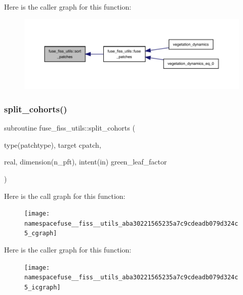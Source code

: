 Here is the caller graph for this function\+:
\nopagebreak
\begin{figure}[H]
\begin{center}
\leavevmode
\includegraphics[width=350pt]{namespacefuse__fiss__utils_a546d7beff2f991a07c8fbba91921ce5f_icgraph}
\end{center}
\end{figure}
\mbox{\label{namespacefuse__fiss__utils_aba30221565235a7c9cdeadb079d324c5}} 
\subsubsection{\texorpdfstring{split\+\_\+cohorts()}{split\_cohorts()}}
{\footnotesize\ttfamily subroutine fuse\+\_\+fiss\+\_\+utils\+::split\+\_\+cohorts (\begin{DoxyParamCaption}\item[{type(patchtype), target}]{cpatch,  }\item[{real, dimension(n\+\_\+pft), intent(in)}]{green\+\_\+leaf\+\_\+factor }\end{DoxyParamCaption})}

Here is the call graph for this function\+:
\nopagebreak
\begin{figure}[H]
\begin{center}
\leavevmode
\texttt{[image: namespacefuse\_\_fiss\_\_utils\_aba30221565235a7c9cdeadb079d324c5\_cgraph]}
\end{center}
\end{figure}
Here is the caller graph for this function\+:
\nopagebreak
\begin{figure}[H]
\begin{center}
\leavevmode
\texttt{[image: namespacefuse\_\_fiss\_\_utils\_aba30221565235a7c9cdeadb079d324c5\_icgraph]}
\end{center}
\end{figure}
\mbox{\label{namespacefuse__fiss__utils_a5dc8f0ad95ff159ac69570ac55856524}} 

